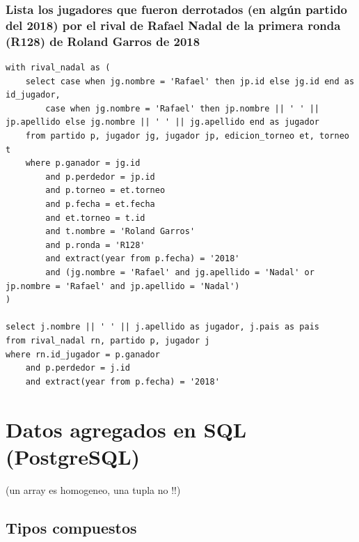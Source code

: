 \documentclass[11pt]{opticajnl}
\begin{document}
\subsubsection{Lista los jugadores que fueron derrotados (en algún partido del 2018) por el rival de Rafael Nadal de la primera ronda (R128) de Roland Garros de 2018}

\begin{verbatim}
with rival_nadal as (
	select case when jg.nombre = 'Rafael' then jp.id else jg.id end as id_jugador, 
		case when jg.nombre = 'Rafael' then jp.nombre || ' ' || jp.apellido else jg.nombre || ' ' || jg.apellido end as jugador
	from partido p, jugador jg, jugador jp, edicion_torneo et, torneo t 
	where p.ganador = jg.id 
		and p.perdedor = jp.id
		and p.torneo = et.torneo 
		and p.fecha = et.fecha
		and et.torneo = t.id 
		and t.nombre = 'Roland Garros'
		and p.ronda = 'R128'
		and extract(year from p.fecha) = '2018'
		and (jg.nombre = 'Rafael' and jg.apellido = 'Nadal' or jp.nombre = 'Rafael' and jp.apellido = 'Nadal') 
)

select j.nombre || ' ' || j.apellido as jugador, j.pais as pais
from rival_nadal rn, partido p, jugador j
where rn.id_jugador = p.ganador 
	and p.perdedor = j.id
	and extract(year from p.fecha) = '2018'
\end{verbatim}


































\section{Datos agregados en SQL (PostgreSQL)}
(un array es homogeneo, una tupla no !!)

\subsection{Tipos compuestos}
\end{document}
